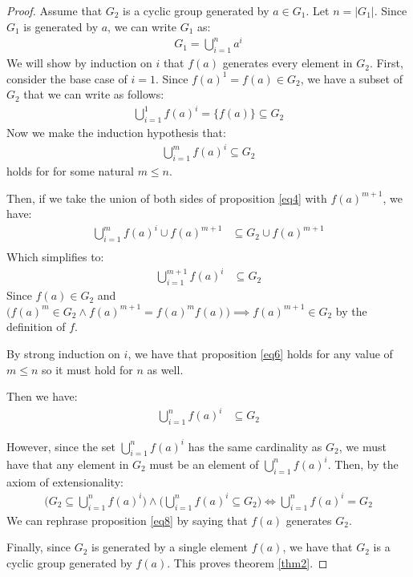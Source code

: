 \documentclass[12pt]{article}
\begin{document}
\begin{proof}
	Assume that $G_2$ is a cyclic group generated by $a \in G_1$.
	Let $n = |G_1|$.
	Since $G_1$ is generated by $a$,
	we can write $G_1$ as:
	\begin{align} \label{eq2}
		G_1 = \bigcup\limits_{i = 1}^n a^i
	\end{align}
	We will show by induction on $i$ that $f(a)$ generates
	every element in $G_2$.
	First, consider the base case of $i = 1$.
	Since $f(a)^1 = f(a) \in G_2$, we have a subset of $G_2$
	that we can write as follows:
	\begin{align} \label{eq3}
		\bigcup\limits_{i = 1}^1 f(a)^i = \{ f(a) \} \subseteq G_2
	\end{align}
	Now we make the induction hypothesis that:
	\begin{align} \label{eq4}
		\bigcup\limits_{i = 1}^m f(a)^i \subseteq G_2
	\end{align}
	holds for for some natural $m \le n$.

	Then, if we take the union of both sides of proposition \ref{eq4}
	with $f(a)^{m+1}$, we have:
	\begin{align} \label{eq5}
		\bigcup\limits_{i = 1}^m f(a)^i \cup f(a)^{m+1} &
		\subseteq G_2 \cup f(a)^{m+1} \\
	\end{align}
	Which simplifies to:
	\begin{align} \label{eq6}
		\bigcup\limits_{i = 1}^{m+1} f(a)^i&
		\subseteq G_2
	\end{align}
	Since $f(a) \in G_2$ and $\Big(f(a)^m \in G_2
	\land f(a)^{m+1} = f(a)^m f(a)\Big) \implies f(a)^{m+1} \in G_2$
	by the definition of $f$.

	By strong induction on $i$,
	we have that proposition \ref{eq6} holds for any value of $m \le n$
	so it must hold for $n$ as well.

	Then we have:
	\begin{align} \label{eq7}
		\bigcup\limits_{i = 1}^{n} f(a)^i&
		\subseteq G_2
	\end{align}

	However, since the set $\bigcup\limits_{i = 1}^{n} f(a)^i$
	has the same cardinality as $G_2$, we must have that
	any element in $G_2$ must be an element of  
	$\bigcup\limits_{i = 1}^{n} f(a)^i$.
	Then, by the axiom of extensionality:
	\begin{align} \label{eq8}
		\Big(G_2 \subseteq
		\bigcup\limits_{i = 1}^{n} f(a)^i \Big)
		\land
		\Big(\bigcup\limits_{i = 1}^n f(a)^i
		\subseteq G_2\Big)
		\iff 
		\bigcup\limits_{i = 1}^n f(a)^i
		= G_2
	\end{align}
	We can rephrase proposition \ref{eq8} by
	saying that $f(a)$ generates $G_2$.

	Finally, since $G_2$ is generated by a single
	element $f(a)$, we have that $G_2$ is a cyclic
	group generated by $f(a)$.
	This proves theorem \ref{thm2}.
\end{proof}
\end{document}
